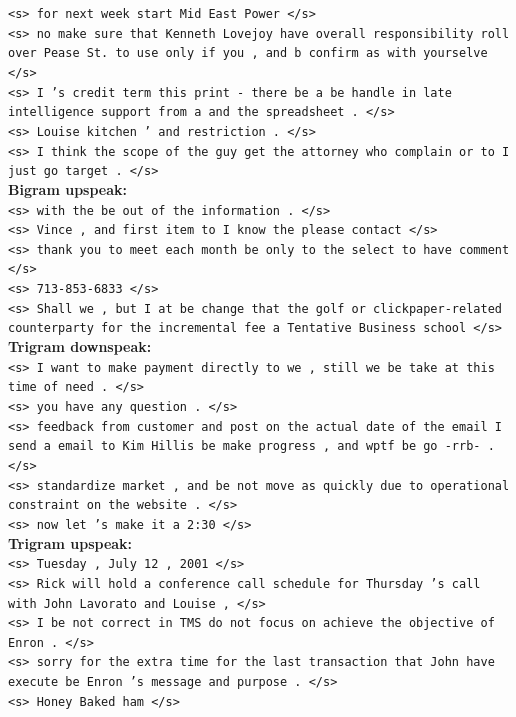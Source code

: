 \documentclass{article} %
\begin{document}
\texttt{<s> for next week start Mid East Power </s>\\
<s> no make sure that Kenneth Lovejoy have overall responsibility roll over Pease St. to use only if you , and b confirm as with yourselve </s>\\
<s> I 's credit term this print - there be a be handle in late intelligence support from a and the spreadsheet . </s>\\
<s> Louise kitchen ' and restriction . </s>\\
<s> I think the scope of the guy get the attorney who complain or to I just go target . </s>}\\

\textbf{Bigram upspeak: }\\

\texttt{<s> with the be out of the information . </s>\\
<s> Vince , and first item to I know the please contact </s>\\
<s> thank you to meet each month be only to the select to have comment </s>\\
<s> 713-853-6833 </s>\\
<s> Shall we , but I at be change that the golf or clickpaper-related counterparty for the incremental fee a Tentative Business school </s>}\\

\textbf{Trigram downspeak:}\\

\texttt{<s> I want to make payment directly to we , still we be take at this time of need . </s>\\
<s> you have any question . </s>\\
<s> feedback from customer and post on the actual date of the email I send a email to Kim Hillis be make progress , and wptf be go -rrb- . </s>\\
<s> standardize market , and be not move as quickly due to operational constraint on the website . </s>\\
<s> now let 's make it a 2:30 </s>}\\

\textbf{Trigram upspeak:}\\

\texttt{<s> Tuesday , July 12 , 2001 </s>\\
<s> Rick will hold a conference call schedule for Thursday 's call with John Lavorato and Louise , </s>\\
<s> I be not correct in TMS do not focus on achieve the objective of Enron . </s>\\
<s> sorry for the extra time for the last transaction that John have execute be Enron 's message and purpose . </s>\\
<s> Honey Baked ham </s>}
\end{document}
